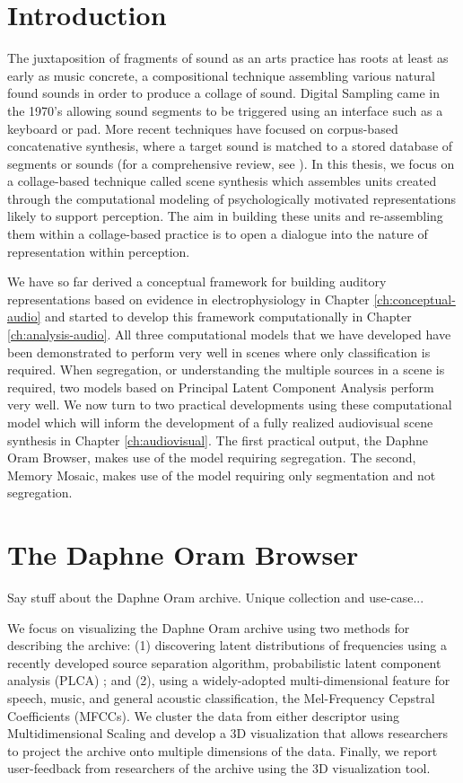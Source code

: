 \documentclass[a4paper,10pt,final]{ThesisStyle}
\begin{document}
\section{Introduction}

The juxtaposition of fragments of sound as an arts practice has roots at least as early as music concrete, a compositional technique assembling various natural found sounds in order to produce a collage of sound.  Digital Sampling came in the 1970's allowing sound segments to be triggered using an interface such as a keyboard or pad.  More recent techniques have focused on corpus-based concatenative synthesis, where a target sound is matched to a stored database of segments or sounds (for a comprehensive review, see \cite{Schwarz2006}).  In this thesis, we focus on a collage-based technique called scene synthesis which assembles units created through the computational modeling of psychologically motivated representations likely to support perception.  The aim in building these units and re-assembling them within a collage-based practice is to open a dialogue into the nature of representation within perception.  

We have so far derived a conceptual framework for building auditory representations based on evidence in electrophysiology in Chapter \ref{ch:conceptual-audio} and started to develop this framework computationally in Chapter \ref{ch:analysis-audio}.  All three computational models that we have developed have been demonstrated to perform very well in scenes where only classification is required.  When segregation, or understanding the multiple sources in a scene is required, two models based on Principal Latent Component Analysis perform very well.  We now turn to two practical developments using these computational model which will inform the development of a fully realized audiovisual scene synthesis in Chapter \ref{ch:audiovisual}.  The first practical output, the Daphne Oram Browser, makes use of the model requiring segregation.  The second, Memory Mosaic, makes use of the model requiring only segmentation and not segregation.  

\section{The Daphne Oram Browser}

Say stuff about the Daphne Oram archive.  Unique collection and use-case... 

We focus on visualizing the Daphne Oram archive using two methods for describing the archive: (1) discovering latent distributions of frequencies using a recently developed source separation algorithm, probabilistic latent component analysis (PLCA) \cite{SmaragdisRajShashanka}; and (2), using a widely-adopted multi-dimensional feature for speech, music, and general acoustic classification, the Mel-Frequency Cepstral Coefficients (MFCCs).  We cluster the data from either descriptor using Multidimensional Scaling and develop a 3D visualization that allows researchers to project the archive onto multiple dimensions of the data.  Finally, we report user-feedback from researchers of the archive using the 3D visualization tool.  
\end{document}
